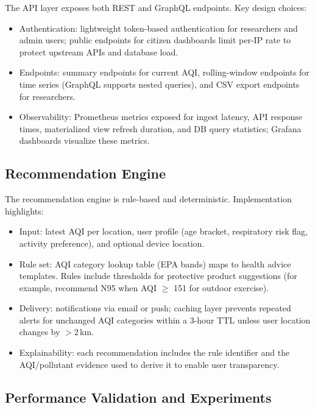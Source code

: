 The API layer exposes both REST and GraphQL endpoints. Key design choices:
\begin{itemize}
    \item Authentication: lightweight token-based authentication for researchers and admin users; public endpoints for citizen dashboards limit per-IP rate to protect upstream APIs and database load.
    \item Endpoints: summary endpoints for current AQI, rolling-window endpoints for time series (GraphQL supports nested queries), and CSV export endpoints for researchers.
    \item Observability: Prometheus metrics exposed for ingest latency, API response times, materialized view refresh duration, and DB query statistics; Grafana dashboards visualize these metrics.
\end{itemize}

\subsection{Recommendation Engine}
\label{subsec:method_reco}

The recommendation engine is rule-based and deterministic. Implementation highlights:
\begin{itemize}
    \item Input: latest AQI per location, user profile (age bracket, respiratory risk flag, activity preference), and optional device location.
    \item Rule set: AQI category lookup table (EPA bands) maps to health advice templates. Rules include thresholds for protective product suggestions (for example, recommend N95 when AQI $\geq$ 151 for outdoor exercise).
    \item Delivery: notifications via email or push; caching layer prevents repeated alerts for unchanged AQI categories within a 3-hour TTL unless user location changes by $>2\,$km.
    \item Explainability: each recommendation includes the rule identifier and the AQI/pollutant evidence used to derive it to enable user transparency.
\end{itemize}

\subsection{Performance Validation and Experiments}
\label{subsec:method_experiments}

